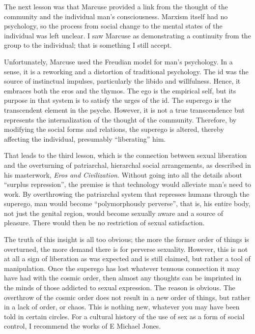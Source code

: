 The next lesson was that Marcuse provided a link from the thought of the community and the individual man's consciousness. Marxism itself had no psychology, so the process from social change to the mental states of the individual was left unclear. I saw Marcuse as demonstrating a continuity from the group to the individual; that is something I still accept.

Unfortunately, Marcuse used the Freudian model for man's psychology. In a sense, it is a reworking and a distortion of traditional psychology. The id was the source of instinctual impulses, particularly the libido and willfulness. Hence, it embraces both the eros and the thymos. The ego is the empirical self, but its purpose in that system is to satisfy the urges of the id. The superego is the transcendent element in the psyche. However, it is not a true transcendence but represents the internalization of the thought of the community. Therefore, by modifying the social forms and relations, the superego is altered, thereby affecting the individual, presumably ``liberating'' him.

That leads to the third lesson, which is the connection between sexual liberation and the overturning of patriarchal, hierarchal social arrangements, as described in his masterwork, \emph{Eros and Civilization}. Without going into all the details about ``surplus repression'', the premise is that technology would alleviate man's need to work. By overthrowing the patriarchal system that represses humans through the superego, man would become ``polymorphously perverse'', that is, his entire body, not just the genital region, would become sexually aware and a source of pleasure. There would then be no restriction of sexual satisfaction.

The truth of this insight is all too obvious; the more the former order of things is overturned, the more demand there is for perverse sexuality. However, this is not at all a sign of liberation as was expected and is still claimed, but rather a tool of manipulation. Once the superego has lost whatever tenuous connection it may have had with the cosmic order, then almost any thoughts can be imprinted in the minds of those addicted to sexual expression. The reason is obvious. The overthrow of the cosmic order does not result in a new order of things, but rather in a lack of order, or chaos. This is nothing new, whatever you may have been told in certain circles. For a cultural history of the use of sex as a form of social control, I recommend the works of E Michael Jones.

